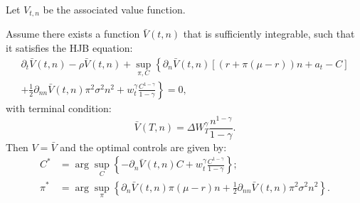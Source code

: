 Let $V_{t,n}$ be the associated value function.

\begin{theorem}
    Assume there exists a function $\bar{V}(t,n)$ that is sufficiently integrable, such that it satisfies the HJB equation:
    \begin{multline*}
        \partial_t \bar{V}(t,n) - \rho \bar{V}(t,n) + \sup_{\pi, C} \left\{ \partial_n \bar{V}(t,n) \left[ (r + \pi(\mu - r)) n + a_t - C \right] \right. \\
        \left. + \frac{1}{2} \partial_{nn} \bar{V}(t,n) \pi^2 \sigma^2 n^2 + w_t^\gamma \frac{C^{1-\gamma}}{1-\gamma} \right\} = 0,
    \end{multline*}
    with terminal condition:
    \begin{equation*}
        \bar{V}(T,n) = \Delta W_T^\gamma \frac{n^{1-\gamma}}{1-\gamma}.
    \end{equation*}
    Then $V = \bar{V}$ and the optimal controls are given by:
    \begin{align*}
        C^* &= \arg \sup_C \left\{ -\partial_n \bar{V}(t,n) C + w_t^\gamma \frac{C^{1-\gamma}}{1-\gamma} \right\}; \\
        \pi^* &= \arg \sup_\pi \left\{ \partial_n \bar{V}(t,n) \pi (\mu - r) n + \frac{1}{2} \partial_{nn} \bar{V}(t,n) \pi^2 \sigma^2 n^2 \right\}.
    \end{align*}
\end{theorem}

